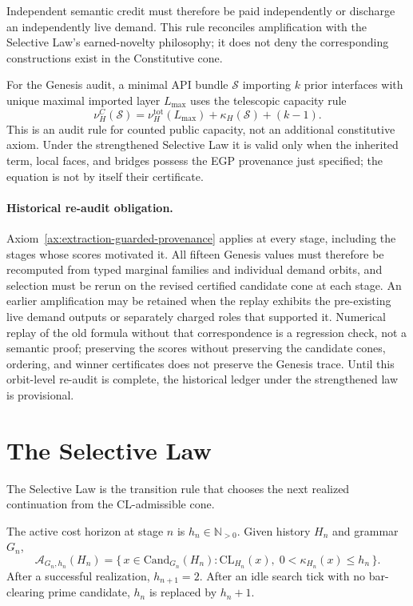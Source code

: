 Independent semantic credit must therefore be paid independently or discharge
an independently live demand. This rule reconciles amplification with the
Selective Law's earned-novelty philosophy; it does not deny the corresponding
constructions exist in the Constitutive cone.

For the Genesis audit, a minimal API bundle \(\mathcal{S}\) importing
\(k\) prior interfaces with unique maximal imported layer \(L_{\max}\) uses the
telescopic capacity rule
\[
\nu^C_H(\mathcal{S})
=
\nu^{\mathrm{tot}}_H(L_{\max})
+ \kappa_H(\mathcal{S}) + (k-1).
\]
This is an audit rule for counted public capacity, not an additional
constitutive axiom. Under the strengthened Selective Law it is valid only when
the inherited term, local faces, and bridges possess the EGP provenance just
specified; the equation is not by itself their certificate.

\paragraph{Historical re-audit obligation.}
Axiom~\ref{ax:extraction-guarded-provenance} applies at every stage, including
the stages whose scores motivated it. All fifteen Genesis values must
therefore be recomputed from typed marginal families and individual demand
orbits, and selection must be rerun on the revised certified candidate cone at
each stage. An earlier amplification may be retained when the replay exhibits the
pre-existing live demand outputs or separately charged roles that supported it.
Numerical replay of the old formula without that correspondence is a regression
check, not a semantic proof; preserving the scores without preserving the
candidate cones, ordering, and winner certificates does not preserve the
Genesis trace. Until this orbit-level re-audit is complete, the historical
ledger under the strengthened law is provisional.

\section{The Selective Law}

The Selective Law is the transition rule that chooses the next realized
continuation from the CL-admissible cone.

\begin{definition}
The active cost horizon at stage \(n\) is \(h_n\in\mathbb{N}_{>0}\). Given
history \(H_n\) and grammar \(G_n\),
\[
\mathcal{A}_{G_n,h_n}(H_n)
=
\{\,x\in\mathrm{Cand}_{G_n}(H_n):
\mathrm{CL}_{H_n}(x),\;
0<\kappa_{H_n}(x)\le h_n\,\}.
\]
After a successful realization, \(h_{n+1}=2\). After an idle search tick with no
bar-clearing prime candidate, \(h_n\) is replaced by \(h_n+1\).
\end{definition}

